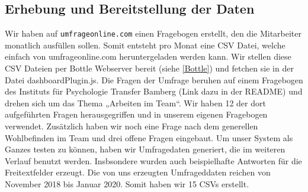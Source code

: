 \documentclass[a4paper,12pt,]{article}
\begin{document}
\subsection{Erhebung und Bereitstellung der Daten}
Wir haben auf {\tt umfrageonline.com} einen Fragebogen erstellt, den die Mitarbeiter monatlich ausfüllen sollen. Somit entsteht pro Monat eine CSV Datei, welche einfach von umfrageonline.com heruntergeladen werden kann. Wir stellen diese CSV Dateien per Bottle Webserver bereit (siehe \ref{Bottle}) und fetchen sie in der Datei dashboardPlugin.js. 
Die Fragen der Umfrage beruhen auf einem Fragebogen des Instituts für Psychologie Transfer Bamberg (Link dazu in der README) und drehen sich um das Thema „Arbeiten im Team“. Wir haben 12 der dort aufgeführten Fragen herausgegriffen und in unserem eigenen Fragebogen verwendet.
Zusätzlich haben wir noch eine Frage nach dem generellen Wohlbefinden im Team und drei offene Fragen eingebaut. Um unser System als Ganzes testen zu können, haben wir Umfragedaten generiert, die im weiteren Verlauf benutzt werden. Insbsondere wurden auch beispielhafte Antworten für die Freitextfelder erzeugt. Die von uns erzeugten Umfrageddaten reichen von November 2018 bis Januar 2020. Somit haben wir 15 CSVs erstellt. 
\end{document}
